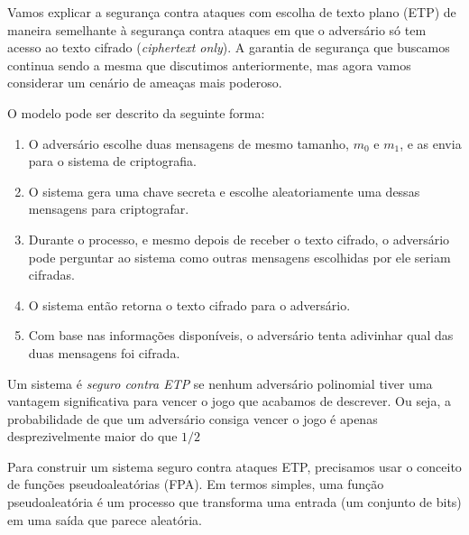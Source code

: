 Vamos explicar a segurança contra ataques com escolha de texto plano (ETP) de maneira semelhante à segurança contra ataques em que o adversário só tem acesso ao texto cifrado (\textit{ciphertext only}).
A garantia de segurança que buscamos continua sendo a mesma que discutimos anteriormente, mas agora vamos considerar um cenário de ameaças mais poderoso.

O modelo pode ser descrito da seguinte forma:

\begin{enumerate}
    \item O adversário escolhe duas mensagens de mesmo tamanho, $m_0$ e $m_1$, e as envia para o sistema de criptografia.
    \item O sistema gera uma chave secreta e escolhe aleatoriamente uma dessas mensagens para criptografar.
    \item Durante o processo, e mesmo depois de receber o texto cifrado, o adversário pode perguntar ao sistema como outras mensagens escolhidas por ele seriam cifradas.
    \item O sistema então retorna o texto cifrado para o adversário.
    \item Com base nas informações disponíveis, o adversário tenta adivinhar qual das duas mensagens foi cifrada.
\end{enumerate}

\begin{center}
\end{center}

Um sistema é {\em seguro contra ETP} se nenhum adversário polinomial tiver uma vantagem significativa para vencer o jogo que acabamos de descrever.
Ou seja, a probabilidade de que um adversário consiga vencer o jogo é apenas desprezivelmente maior do que $1/2$

Para construir um sistema seguro contra ataques ETP, precisamos usar o conceito de funções pseudoaleatórias (FPA).
Em termos simples, uma função pseudoaleatória é um processo que transforma uma entrada (um conjunto de bits) em uma saída que parece aleatória.

